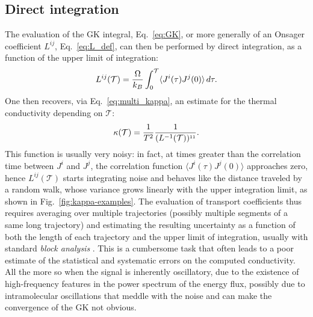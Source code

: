 \begin{LEtext}
\subsection{Direct integration}  \label{sec:direct-integration}
The evaluation of the GK integral, Eq.~\eqref{eq:GK}, or more generally of an Onsager coefficient $L^{ij}$, Eq.~\eqref{eq:L_def}, can then be performed by direct integration, as a function of the upper limit of integration: 
\begin{equation}
    L^{ij}(\mathcal{T}) = \frac{\rOmega}{k_B} \int_0^\mathcal{T} \langle J^i(\tau)J^j(0)\rangle \,d\tau .  \label{eq:Lij-integralT}
\end{equation}
One then recovers, via Eq.~\eqref{eq:multi_kappa}, an estimate for the thermal conductivity depending on $\mathcal{T}$:
\begin{equation}
    \kappa(\mathcal{T}) = \frac{1}{T^2} \frac{1}{(L^{-1}(\mathcal{T}))^{\smallone\smallone}}.  \label{eq:kappa-integralT}
\end{equation}
This function is usually very noisy: in fact, at times greater than the correlation time between $J^i$ and $J^j$, the correlation function $\langle J^i(\tau)J^j(0)\rangle$ approaches zero, hence $L^{ij}(\mathcal{T})$ starts integrating noise and behaves like the distance traveled by a random walk, whose variance grows linearly with the upper integration limit, as shown in Fig.~\ref{fig:kappa-examples}.
The evaluation of transport coefficients thus requires averaging over multiple trajectories (possibly multiple segments of a same long trajectory) and estimating the resulting uncertainty as a function of both the length of each trajectory and the upper limit of integration, usually with standard \emph{block analysis} \cite{Frenkel2001}. This is a cumbersome task that often leads to a poor estimate of the statistical and systematic errors on the computed conductivity. All the more so when the signal is inherently oscillatory, due to the existence of high-frequency features in the power spectrum of the energy flux, possibly due to intramolecular oscillations that meddle with the noise and can make the convergence of the GK not obvious.


\end{LEtext}
